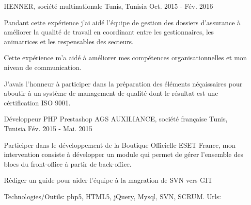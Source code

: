 \begin{cventries}
    {HENNER, société multinationale}
    {Tunis, Tunisia}
    {Oct. 2015 - Fév. 2016}
    {
      \begin{cvitems}
        \item {Pandant cette expérience j'ai aidé l'équipe de gestion des dossiers d'assurance à améliorer la qualité de travail en coordinant entre les gestionnaires, les animatrices et les respensables des secteurs.}
        \item {Cette expérience m'a aidé à améliorer mes compétences organisationnelles et mon niveau de communication.}
        \item {J'avais l'honneur à participer dans la préparation des éléments néçaissaires pour aboutir à un système de management de qualité dont le résultat est une cértification ISO 9001.}
      \end{cvitems}
    }
    {}{}{}
  \techentries
    {Développeur PHP Prestashop}
    {AGS AUXILIANCE, société française}
    {Tunis, Tunisia}
    {Fév. 2015 - Mai. 2015}
    {
      \begin{cvitems}
        \item {Participer dans le développement de la Boutique Officielle ESET France, mon intervention consiste à développer un module qui permet  de gérer l'ensemble des blocs du front-office à partir de back-office.}
        \item {Rédiger un guide pour aider l'équipe à la magration de SVN vers GIT}
      \end{cvitems}
    }
    {\textcolor{awesome}{Technologies/Outils: } {\color{graytext}}  {php5, HTML5, jQuery, Mysql, SVN, SCRUM.}}
    {Urls:} 
    {\href{https://www.boutique-eset.com/}{} \break}
    { }\break
\end{cventries}